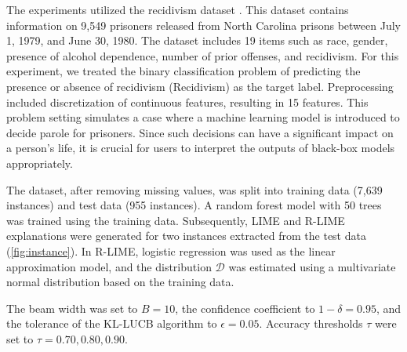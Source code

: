 \documentclass[runningheads]{llncs}
\begin{document}
The experiments utilized the recidivism dataset \cite{schmidt1988predicting}. This dataset contains information on 9,549 prisoners released from North Carolina prisons between July 1, 1979, and June 30, 1980. The dataset includes 19 items such as race, gender, presence of alcohol dependence, number of prior offenses, and recidivism. For this experiment, we treated the binary classification problem of predicting the presence or absence of recidivism (Recidivism) as the target label. Preprocessing included discretization of continuous features, resulting in 15 features. This problem setting simulates a case where a machine learning model is introduced to decide parole for prisoners. Since such decisions can have a significant impact on a person's life, it is crucial for users to interpret the outputs of black-box models appropriately.

The dataset, after removing missing values, was split into training data (7,639 instances) and test data (955 instances). A random forest model with 50 trees was trained using the training data. Subsequently, LIME and R-LIME explanations were generated for two instances extracted from the test data (\cref{fig:instance}). In R-LIME, logistic regression was used as the linear approximation model, and the distribution $\mathcal{D}$ was estimated using a multivariate normal distribution based on the training data.

The beam width was set to $B=10$, the confidence coefficient to $1-\delta=0.95$, and the tolerance of the KL-LUCB algorithm to $\epsilon=0.05$. Accuracy thresholds $\tau$ were set to $\tau=0.70,0.80,0.90$.
\end{document}
